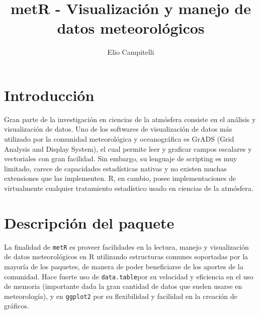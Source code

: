 \documentclass[runningheads,13pt]{llncs}\usepackage{knitr}
\begin{document}
\title{metR - Visualización y manejo de datos meteorológicos}

%
\author{Elio Campitelli}

%
%
%
\maketitle              %





\section{Introducción}

Gran parte de la investigación en ciencias de la atmósfera consiste en el análisis y visualización de datos. Uno de los softwares de visualización de datos más utilizado por la comunidad meteorológica y oceanográfica es GrADS (Grid Analysis and Display System), el cual permite leer y graficar campos escalares y vectoriales con gran facilidad. Sin embargo, su lenguaje de scripting es muy limitado, carece de capacidades estadísticas nativas y no existen muchas extensiones que las implementen. R, en cambio, posee implementaciones de virtualmente cualquier tratamiento estadístico usado en ciencias de la atmósfera. 

\section{Descripción del paquete}

La finalidad de \texttt{metR} es proveer facilidades en la lectura, manejo y visualización de datos meteorológicos en R utilizando estructuras comunes soportadas por la mayoría de los paquetes, de manera de poder beneficiarse de los aportes de la comunidad. Hace fuerte uso de \texttt{data.table}por su velocidad y eficiencia en el uso de memoria (importante dada la gran cantidad de datos que suelen usarse en meteorología), y en \texttt{ggplot2} por su flexibilidad y facilidad en la creación de gráficos. 
\end{document}
